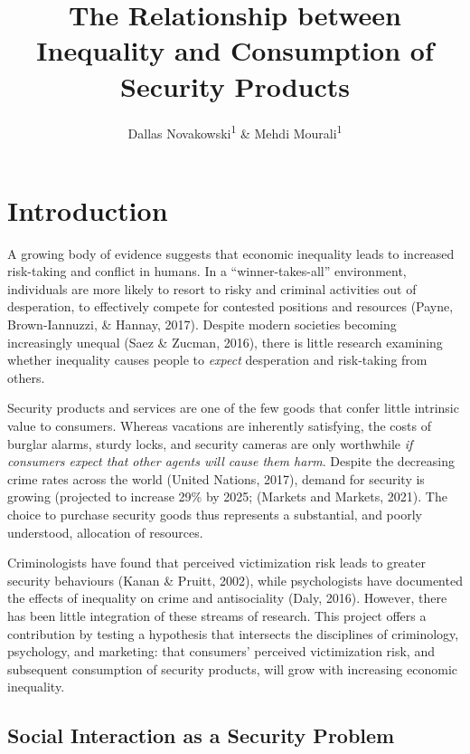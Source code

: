 \documentclass[
  english,
  man]{apa6}
\title{The Relationship between Inequality and Consumption of Security Products}
\author{Dallas Novakowski\textsuperscript{1} \& Mehdi Mourali\textsuperscript{1}}
\date{}
\affiliation{\vspace{0.5cm}\textsuperscript{1} University of Calgary, Haskayne School of Business}
\begin{document}
\maketitle

\hypertarget{introduction}{%
\section{Introduction}\label{introduction}}

A growing body of evidence suggests that economic inequality leads to increased risk-taking and conflict in humans. In a ``winner-takes-all'' environment, individuals are more likely to resort to risky and criminal activities out of desperation, to effectively compete for contested positions and resources (Payne, Brown-Iannuzzi, \& Hannay, 2017). Despite modern societies becoming increasingly unequal (Saez \& Zucman, 2016), there is little research examining whether inequality causes people to \emph{expect} desperation and risk-taking from others.

Security products and services are one of the few goods that confer little intrinsic value to consumers. Whereas vacations are inherently satisfying, the costs of burglar alarms, sturdy locks, and security cameras are only worthwhile \emph{if consumers expect that other agents will cause them harm}. Despite the decreasing crime rates across the world (United Nations, 2017), demand for security is growing (projected to increase 29\% by 2025; (Markets and Markets, 2021). The choice to purchase security goods thus represents a substantial, and poorly understood, allocation of resources.

Criminologists have found that perceived victimization risk leads to greater security behaviours (Kanan \& Pruitt, 2002), while psychologists have documented the effects of inequality on crime and antisociality (Daly, 2016). However, there has been little integration of these streams of research. This project offers a contribution by testing a hypothesis that intersects the disciplines of criminology, psychology, and marketing: that consumers' perceived victimization risk, and subsequent consumption of security products, will grow with increasing economic inequality.

\hypertarget{social-interaction-as-a-security-problem}{%
\subsection{Social Interaction as a Security Problem}\label{social-interaction-as-a-security-problem}}
\end{document}
